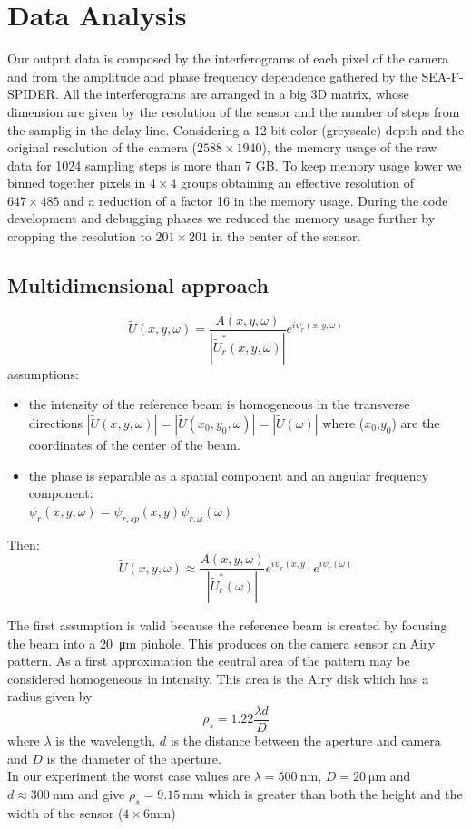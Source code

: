 \documentclass[12pt,a4paper,twoside]{article}
\begin{document}
\section{Data Analysis}
\label{sec_data_analysis}
Our output data is composed by the interferograms of each pixel of the camera and from the amplitude and phase frequency dependence gathered by the SEA-F-SPIDER.
All the interferograms are arranged in a big 3D matrix, whose dimension are given by the resolution of the sensor and the number of steps from the samplig in the delay line.
Considering a 12-bit color (greyscale) depth and the original resolution of the camera ($2588\times 1940$), the memory usage of the raw data for 1024 sampling steps is more than 7 GB.
To keep memory usage lower we binned together pixels in $4\times 4$ groups obtaining an effective resolution of $647\times 485$ and a reduction of a factor 16 in the memory usage.
During the code development and debugging phases we reduced the memory usage further by cropping the resolution to $201\times 201$ in the center of the sensor.

\subsection{Multidimensional approach}
\begin{equation}
	\tilde{U}(x,y,\omega) = \frac{A(x,y,\omega)}{|\tilde{U}_r^*(x,y,\omega)|}e^{i\psi_r(x,y,\omega)}
\end{equation}
assumptions:
\begin{itemize}
\item the intensity of the reference beam is homogeneous in the transverse directions $|\tilde{U}(x,y,\omega)|=|\tilde{U}(x_0,y_0,\omega)|=|\tilde{U}(\omega)|$ where ($x_0$,$y_0$) are the coordinates of the center of the beam.
\item the phase is separable as a spatial component and an angular frequency component:\\ $\psi_r(x,y,\omega) = \psi_{r,sp}(x,y)\psi_{r,\omega}(\omega)$
\end{itemize}
Then:
\begin{equation}
	\tilde{U}(x,y,\omega) \approx \frac{A(x,y,\omega)}{|\tilde{U}_r^*(\omega)|}e^{i\psi_r(x,y)}e^{i\psi_r(\omega)}
\end{equation}

The first assumption is valid because the reference beam is created by focusing the beam into a \SI{20}{\um} pinhole.
This produces on the camera sensor an Airy pattern.
As a first approximation the central area of the pattern may be considered homogeneous in intensity.
This area is the Airy disk which has a radius given by
$$\rho_s = 1.22 \frac{\lambda d}{D}$$
where $\lambda$ is the wavelength, $d$ is the distance between the aperture and camera and $D$ is the diameter of the aperture.\\
In our experiment the worst case values are $\lambda = \SI{500}{\nm}$, $D = \SI{20}{\um}$ and $d \approx \SI{300}{\mm}$ and give $\rho_s = \SI{9.15}{\mm}$ which is greater than both the height and the width of the sensor ($4 \times 6 \si{\mm}$)
\end{document}

